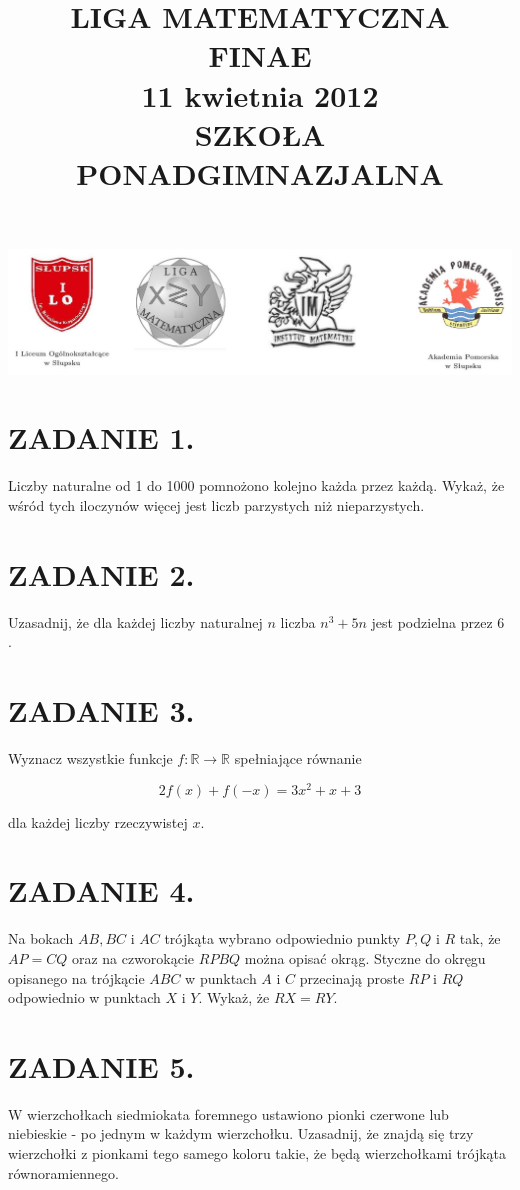 \documentclass[10pt]{article}
\title{LIGA MATEMATYCZNA \\
 FINAE \\
 11 kwietnia 2012 \\
 SZKOŁA PONADGIMNAZJALNA }
\author{}
\date{}
\begin{document}
\maketitle
\begin{center}
\includegraphics[max width=\textwidth]{2024_11_21_dee6a28cd8cf08628b10g-1}
\end{center}

\section*{ZADANIE 1.}
Liczby naturalne od 1 do 1000 pomnożono kolejno każda przez każdą. Wykaż, że wśród tych iloczynów więcej jest liczb parzystych niż nieparzystych.

\section*{ZADANIE 2.}
Uzasadnij, że dla każdej liczby naturalnej \(n\) liczba \(n^{3}+5 n\) jest podzielna przez 6 .

\section*{ZADANIE 3.}
Wyznacz wszystkie funkcje \(f: \mathbb{R} \rightarrow \mathbb{R}\) spełniające równanie

\[
2 f(x)+f(-x)=3 x^{2}+x+3
\]

dla każdej liczby rzeczywistej \(x\).

\section*{ZADANIE 4.}
Na bokach \(A B, B C\) i \(A C\) trójkąta wybrano odpowiednio punkty \(P, Q\) i \(R\) tak, że \(A P=C Q\) oraz na czworokącie \(R P B Q\) można opisać okrąg. Styczne do okręgu opisanego na trójkącie \(A B C\) w punktach \(A\) i \(C\) przecinają proste \(R P\) i \(R Q\) odpowiednio w punktach \(X\) i \(Y\). Wykaż, że \(R X=R Y\).

\section*{ZADANIE 5.}
W wierzchołkach siedmiokata foremnego ustawiono pionki czerwone lub niebieskie - po jednym w każdym wierzchołku. Uzasadnij, że znajdą się trzy wierzchołki z pionkami tego samego koloru takie, że będą wierzchołkami trójkąta równoramiennego.
\end{document}
